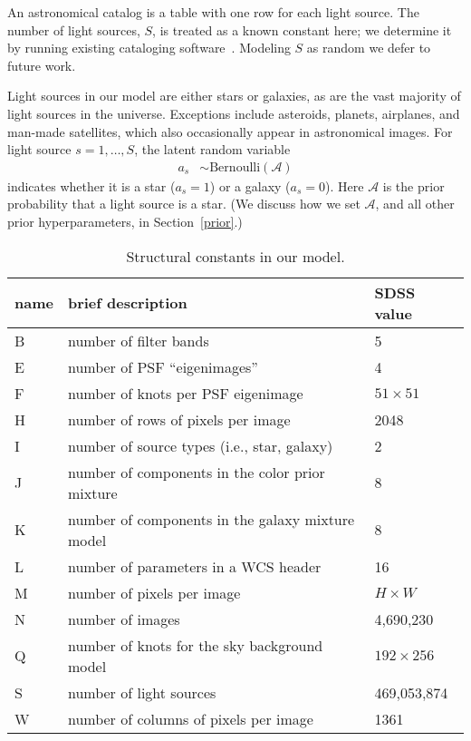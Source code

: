An astronomical catalog is a table with one row for each light source.
The number of light sources, $S$, is treated as a known constant here; we determine it by running existing cataloging software~\citep{bertin1996sextractor}.
Modeling $S$ as random we defer to future work.

Light sources in our model are either stars or galaxies, as are the vast majority of light sources in the universe.
Exceptions include asteroids, planets, airplanes, and man-made satellites, which also occasionally appear in astronomical images.
For light source $s=1,\ldots,S$, the latent random variable
\begin{align}
a_s &\sim \mathrm{Bernoulli}(\mathcal A)
\end{align}
indicates whether it is a star (${a_s=1}$) or a galaxy (${a_s=0}$). Here $\mathcal{A}$ is the prior probability that a light source is a star. (We discuss how we set $\mathcal A$, and all other prior hyperparameters, in Section~\ref{prior}.)


\FloatBarrier
\begin{table}
\centering
\caption{Structural constants in our model.}
\label{params}
\centering
\begin{tabular}{lll}
\toprule
\textbf{name} & \textbf{brief description}  & \textbf{SDSS value} \\
\hline
B & number of filter bands & 5\\
E & number of PSF ``eigenimages'' & 4\\
F & number of knots per PSF eigenimage & $51 \times 51$\\
H & number of rows of pixels per image & 2048 \\
I & number of source types (i.e., star, galaxy) & 2\\
J & number of components in the color prior mixture & 8\\
K & number of components in the galaxy mixture model & 8\\
L & number of parameters in a WCS header & 16\\
M & number of pixels per image & $H \times W$\\
N & number of images & 4,690,230\\
Q & number of knots for the sky background model & $192 \times 256$\\
S & number of light sources & 469,053,874\\
W & number of columns of pixels per image & 1361 \\
\hline
\end{tabular}
\label{structural-table}
\end{table}

